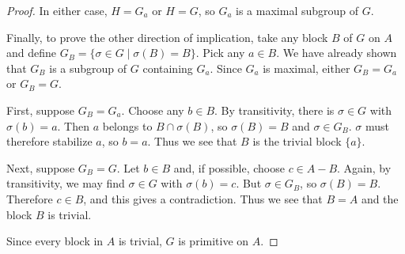\begin{enumerate}
\begin{proof}
    In either case, $H = G_a$ or $H = G$, so $G_a$ is a maximal
    subgroup of $G$.

    Finally, to prove the other direction of implication, take any
    block $B$ of $G$ on $A$ and define
    $G_B = \{\sigma\in G\mid\sigma(B) = B\}$. Pick any $a\in B$. We
    have already shown that $G_B$ is a subgroup of $G$ containing
    $G_a$. Since $G_a$ is maximal, either $G_B = G_a$ or $G_B = G$.

    First, suppose $G_B = G_a$. Choose any $b\in B$. By transitivity,
    there is $\sigma\in G$ with $\sigma(b) = a$. Then $a$ belongs to
    $B\cap\sigma(B)$, so $\sigma(B) = B$ and $\sigma\in G_B$. $\sigma$
    must therefore stabilize $a$, so $b = a$. Thus we see that $B$ is
    the trivial block $\{a\}$.

    Next, suppose $G_B = G$. Let $b\in B$ and, if possible, choose
    $c\in A - B$. Again, by transitivity, we may find $\sigma\in G$
    with $\sigma(b) = c$. But $\sigma\in G_B$, so $\sigma(B) =
    B$. Therefore $c\in B$, and this gives a contradiction. Thus we
    see that $B = A$ and the block $B$ is trivial.

    Since every block in $A$ is trivial, $G$ is primitive on $A$.
  \end{proof}
\end{enumerate}

